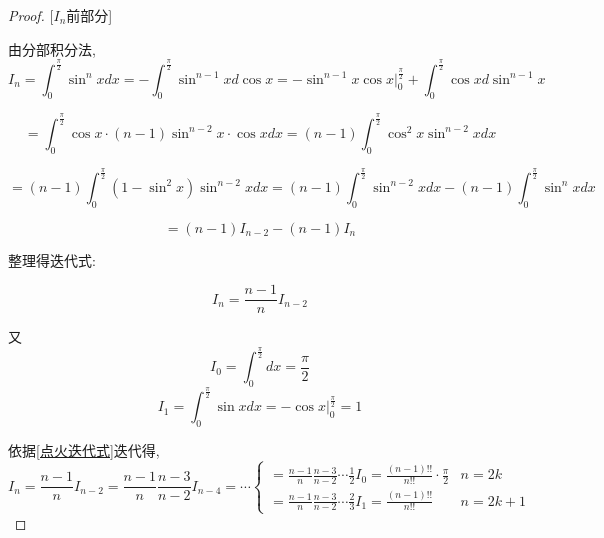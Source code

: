 \begin{proof}
    
    [$I_n$前部分]
    
    由分部积分法,
    \begin{equation*}
        I_n=\int_{0}^{\frac{\pi}{2}} \sin^n xdx
        =-\int_{0}^{\frac{\pi}{2}} \sin^{n-1}x d \cos x
        =-\sin^{n-1} x \cos x|_{0}^{\frac{\pi}{2}}+\int_{0}^{\frac{\pi}{2}} \cos x d \sin^{n-1} x
    \end{equation*}

    \begin{equation*}
        =\int_{0}^{\frac{\pi}{2}} \cos x\cdot (n-1)\sin^{n-2} x \cdot \cos x dx
        =(n-1)\int_{0}^{\frac{\pi}{2}} \cos^2 x \sin^{n-2} x dx
    \end{equation*}

    \begin{equation*}
        =(n-1)\int_{0}^{\frac{\pi}{2}} (1-\sin^2 x) \sin^{n-2} x dx
        =(n-1)\int_{0}^{\frac{\pi}{2}}\sin^{n-2} xdx - (n-1)\int_{0}^{\frac{\pi}{2}}\sin^n xdx
    \end{equation*}

    \begin{equation*}
        = (n-1)I_{n-2}-(n-1)I_n
    \end{equation*}

    整理得迭代式:

    \begin{equation}
        I_n = \frac{n-1}{n} I_{n-2} \label{点火迭代式}
    \end{equation}
    
    又
    \begin{equation*}
        I_0 = \int_{0}^{\frac{\pi}{2}} dx = \frac{\pi}{2}
    \end{equation*}
    \begin{equation*}
        I_1 = \int_{0}^{\frac{\pi}{2}} \sin x dx = -\cos x|_{0}^{\frac{\pi}{2}} = 1 
    \end{equation*}

    依据\cref{点火迭代式}迭代得,\
    \begin{equation}
        I_n = \frac{n-1}{n} I_{n-2}
        = \frac{n-1}{n} \frac{n-3}{n-2} I_{n-4}=\cdots 
        \begin{cases}
            = \frac{n-1}{n} \frac{n-3}{n-2} \cdots \frac{1}{2}I_0 = \frac{(n-1)!!}{n!!} \cdot \frac{\pi}{2}& n=2k\\
            = \frac{n-1}{n} \frac{n-3}{n-2} \cdots \frac{2}{3}I_1 = \frac{(n-1)!!}{n!!} & n=2k+1
        \end{cases}
    \end{equation}
    

\end{proof}
